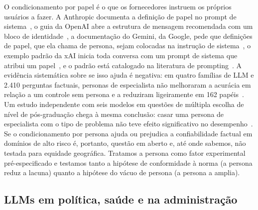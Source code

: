 O condicionamento por papel é o que os fornecedores instruem os próprios
usuários a fazer. A Anthropic documenta a definição de papel no prompt de
sistema~\citep{anthropic2026systemprompts}, o guia da OpenAI abre a estrutura
de mensagem recomendada com um bloco de identidade~\citep{openai2026promptengineering},
a documentação do Gemini, da Google, pede que definições de papel, que ela
chama de persona, sejam colocadas na instrução de
sistema~\citep{google2026promptingstrategies}, o exemplo padrão da xAI inicia
toda conversa com um prompt de sistema que atribui um
papel~\citep{xai2026chatguide}, e o padrão está catalogado na literatura de
prompting~\citep{white2023prompt}. A evidência sistemática sobre se isso ajuda
é negativa: em quatro famílias de LLM e 2.410 perguntas factuais, personas de
especialista não melhoraram a acurácia em relação a um controle sem persona e
a reduziram ligeiramente em 162 papéis~\citep{zheng2024helpful}. Um estudo
independente com seis modelos em questões de múltipla escolha de nível de
pós-graduação chega à mesma conclusão: casar uma persona de especialista com o
tipo de problema não teve efeito significativo no
desempenho~\citep{mollick2025personas}. Se o condicionamento por persona ajuda
ou prejudica a confiabilidade factual em domínios de alto risco é, portanto,
questão em aberto e, até onde sabemos, não testada para equidade geográfica.
Tratamos a persona como fator experimental pré-especificado e testamos tanto a
hipótese de conformidade à norma (a persona reduz a lacuna) quanto a hipótese
do vácuo de persona (a persona a amplia).

\subsection{LLMs em política, saúde e na administração}

